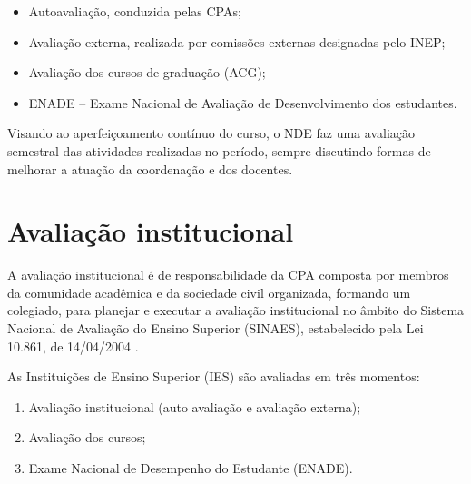 
\begin{itemize}
    \item Autoavaliação, conduzida pelas CPAs;
    \item Avaliação externa, realizada por comissões externas designadas pelo INEP;
    \item Avaliação dos cursos de graduação (ACG);
    \item ENADE – Exame Nacional de Avaliação de Desenvolvimento dos estudantes.
\end{itemize}
     

Visando ao aperfeiçoamento contínuo do curso, o NDE faz uma avaliação semestral das atividades realizadas no período, sempre discutindo formas de melhorar a atuação da coordenação e dos docentes. 

\section{Avaliação institucional}

A avaliação institucional é de responsabilidade da CPA composta por membros da comunidade acadêmica e da sociedade civil organizada, formando um colegiado, para planejar e executar a avaliação institucional no âmbito do Sistema Nacional de Avaliação do Ensino Superior (SINAES), estabelecido pela Lei 10.861, de 14/04/2004 \cite{Lei:10861:2004}.

As Instituições de Ensino Superior (IES) são avaliadas em três momentos:

\begin{enumerate}
    \item Avaliação institucional (auto avaliação e avaliação externa);
    \item Avaliação dos cursos;
    \item Exame Nacional de Desempenho do Estudante (ENADE).
\end{enumerate}

